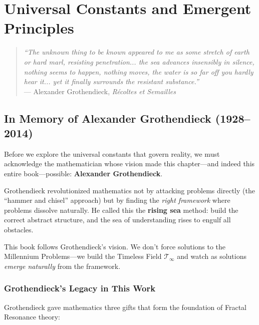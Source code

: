 \chapter{Universal Constants and Emergent Principles}
\label{ch:constants}

\begin{quote}
\textit{``The unknown thing to be known appeared to me as some stretch of earth or hard marl, resisting penetration... the sea advances insensibly in silence, nothing seems to happen, nothing moves, the water is so far off you hardly hear it... yet it finally surrounds the resistant substance.''} \\
--- Alexander Grothendieck, \textit{Récoltes et Semailles}
\end{quote}

\section{In Memory of Alexander Grothendieck (1928--2014)}

\begin{intuitive}
Before we explore the universal constants that govern reality, we must acknowledge the mathematician whose vision made this chapter---and indeed this entire book---possible: \textbf{Alexander Grothendieck}.

Grothendieck revolutionized mathematics not by attacking problems directly (the ``hammer and chisel'' approach) but by finding the \textit{right framework} where problems dissolve naturally. He called this the \textbf{rising sea} method: build the correct abstract structure, and the sea of understanding rises to engulf all obstacles.

This book follows Grothendieck's vision. We don't force solutions to the Millennium Problems---we build the Timeless Field $\mathcal{T}_\infty$ and watch as solutions \textit{emerge naturally} from the framework.
\end{intuitive}

\subsection{Grothendieck's Legacy in This Work}

Grothendieck gave mathematics three gifts that form the foundation of Fractal Resonance theory:

